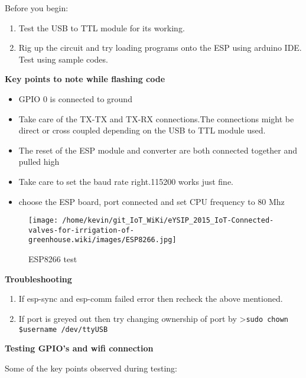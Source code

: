 \documentclass[16pt]{article}
\begin{document}
Before you begin:

\begin{enumerate}

\item
  Test the USB to TTL module for its working.
\item
  Rig up the circuit and try loading programs onto the ESP using arduino
  IDE. Test using sample codes.
\end{enumerate}



\textbf{Key points to note while flashing code}

\begin{itemize}

\item
  GPIO 0 is connected to ground
\item
  Take care of the TX-TX and TX-RX connections.The connections might be
  direct or cross coupled depending on the USB to TTL module used.
\item
  The reset of the ESP module and converter are both connected together
  and pulled high
\item
  Take care to set the baud rate right.115200 works just fine.
\item
  choose the ESP board, port connected and set CPU frequency to 80 Mhz
\end{itemize}

\begin{figure}
\hspace{2cm}
\texttt{[image: /home/kevin/git\_IoT\_WiKi/eYSIP\_2015\_IoT-Connected-valves-for-irrigation-of-greenhouse.wiki/images/ESP8266.jpg]}
\caption{ESP8266 test}
\end{figure}

\vspace{0.5cm}
{\Large{\textbf{Troubleshooting}}}

\begin{enumerate}

\item
  If esp-sync and esp-comm failed error then recheck the above
  mentioned.
\item
  If port is greyed out then try changing ownership of port by
  \textgreater{}\texttt{sudo chown \$username /dev/ttyUSB}
\end{enumerate}

\vspace{0.5cm}
\textbf{Testing GPIO's and wifi connection}

Some of the key points observed during testing:
\end{document}
